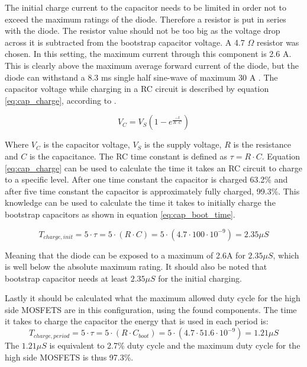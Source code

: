 The initial charge current to the capacitor needs to be limited in order not to exceed the maximum ratings of the diode.
Therefore a resistor is put in series with the diode.
The resistor value should not be too big as the voltage drop across it is subtracted from the bootstrap capacitor voltage.
A 4.7 $\Omega$ resistor was chosen. In this setting, the maximum current through this component is 2.6 A.
This is clearly above the maximum average forward current of the diode, but the diode can withstand a 8.3 ms single half sine-wave of maximum 30 A \cite{diode_ds}.
The capacitor voltage while charging in a RC circuit is described by equation \ref{eq:cap_charge}, according to \cite{prac_ele_for_inven}.

\begin{equation}
	V_C = V_S (1-e^{\frac{-t}{R\cdot C}})
	\label{eq:cap_charge}
\end{equation}

Where $V_C$ is the capacitor voltage, $V_S$ is the supply voltage, $R$ is the resistance and $C$ is the capacitance.
The RC time constant is defined as $\tau = R\cdot C$.
Equation \ref{eq:cap_charge} can be used to calculate the time it takes an RC circuit to charge to a specific level.
After one time constant the capacitor is charged 63.2\% and after five time constant the capacitor is approximately fully charged, 99.3\%.
This knowledge can be used to calculate the time it takes to initially charge the bootstrap capacitors as shown in equation \ref{eq:cap_boot_time}.

\begin{equation}
T_{charge,init} = 5\cdot \tau = 5\cdot (R \cdot C) = 5\cdot (4.7 \cdot 100 \cdot 10^{-9}) = 2.35 \mu S 
\label{eq:cap_boot_time}
\end{equation}

Meaning that the diode can be exposed to a maximum of 2.6A for $2.35 \mu S $, which is well below the absolute maximum rating.
It should also be noted that bootstrap capacitor needs at least $2.35 \mu S $ for the initial charging.

Lastly it should be calculated what the maximum allowed duty cycle for the high side MOSFETS are in this configuration, using the found components.
The time it takes to charge the capacitor the energy that is used in each period is:
\begin{equation}
	T_{charge,period} = 5\cdot \tau = 5\cdot (R \cdot C_{boot}) = 5\cdot (4.7 \cdot  51.6 \cdot 10^{-9}) = 1.21 \mu S 
\end{equation}
The $1.21 \mu S$ is equivalent to 2.7\% duty cycle and the maximum duty cycle for the high side MOSFETS is thus 97.3\%.

